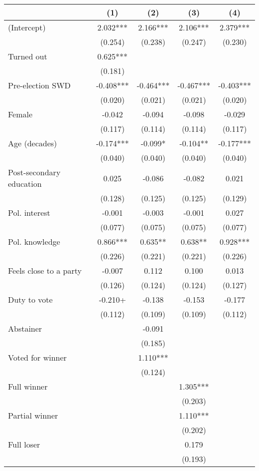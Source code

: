 \begin{table}
\centering
\begin{tabular}[t]{lcccc}
\toprule
  & (1) & (2) & (3) & (4)\\
\midrule
(Intercept) & 2.032*** & 2.166*** & 2.106*** & 2.379***\\
 & (0.254) & (0.238) & (0.247) & (0.230)\\
Turned out & 0.625*** &  &  & \\
 & (0.181) &  &  & \\
Pre-election SWD & -0.408*** & -0.464*** & -0.467*** & -0.403***\\
 & (0.020) & (0.021) & (0.021) & (0.020)\\
Female & -0.042 & -0.094 & -0.098 & -0.029\\
 & (0.117) & (0.114) & (0.114) & (0.117)\\
Age (decades) & -0.174*** & -0.099* & -0.104** & -0.177***\\
 & (0.040) & (0.040) & (0.040) & (0.040)\\
Post-secondary education & 0.025 & -0.086 & -0.082 & 0.021\\
 & (0.128) & (0.125) & (0.125) & (0.129)\\
Pol. interest & -0.001 & -0.003 & -0.001 & 0.027\\
 & (0.077) & (0.075) & (0.075) & (0.077)\\
Pol. knowledge & 0.866*** & 0.635** & 0.638** & 0.928***\\
 & (0.226) & (0.221) & (0.221) & (0.226)\\
Feels close to a party & -0.007 & 0.112 & 0.100 & 0.013\\
 & (0.126) & (0.124) & (0.124) & (0.127)\\
Duty to vote & -0.210+ & -0.138 & -0.153 & -0.177\\
 & (0.112) & (0.109) & (0.109) & (0.112)\\
Abstainer &  & -0.091 &  & \\
 &  & (0.185) &  & \\
Voted for winner &  & 1.110*** &  & \\
 &  & (0.124) &  & \\
Full winner &  &  & 1.305*** & \\
 &  &  & (0.203) & \\
Partial winner &  &  & 1.110*** & \\
 &  &  & (0.202) & \\
Full loser &  &  & 0.179 & \\
 &  &  & (0.193) & \\

\end{tabular}
\end{table}
